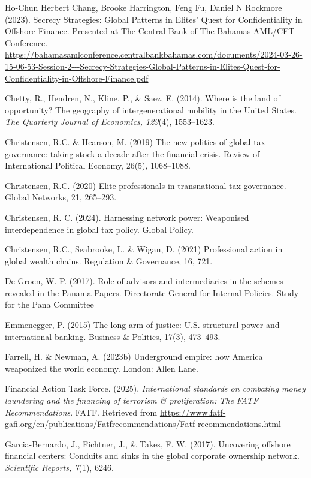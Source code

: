 \begin{thebibliography}{99}
Ho-Chun Herbert Chang, Brooke Harrington, Feng Fu, Daniel N Rockmore (2023). Secrecy Strategies: Global Patterns in Elites' Quest for Confidentiality in Offshore Finance. Presented at The Central Bank of The Bahamas AML/CFT Conference. \url{https://bahamasamlconference.centralbankbahamas.com/documents/2024-03-26-15-06-53-Session-2---Secrecy-Strategies-Global-Patterns-in-Elites-Quest-for-Confidentiality-in-Offshore-Finance.pdf}

Chetty, R., Hendren, N., Kline, P., \& Saez, E. (2014). Where is the land of opportunity? The geography of intergenerational mobility in the United States. \textit{The Quarterly Journal of Economics, 129}(4), 1553–1623.

Christensen, R.C. \& Hearson, M. (2019) The new politics of global tax governance: taking stock a decade after the financial crisis. Review of International Political Economy, 26(5), 1068–1088. 

Christensen, R.C. (2020) Elite professionals in transnational tax governance. Global Networks, 21, 265–293. 

Christensen, R. C. (2024). Harnessing network power: Weaponised interdependence in global tax policy. Global Policy.

Christensen, R.C., Seabrooke, L. \& Wigan, D. (2021) Professional action in global wealth chains. Regulation \& Governance, 16, 721. 

De Groen, W. P. (2017). Role of advisors and intermediaries in the schemes revealed in the Panama Papers. Directorate-General for Internal Policies. Study for the Pana Committee

Emmenegger, P. (2015) The long arm of justice: U.S. structural power and international banking. Business \& Politics, 17(3), 473–493. 

Farrell, H. \& Newman, A. (2023b) Underground empire: how America weaponized the world economy. London: Allen Lane.

Financial Action Task Force. (2025). \textit{International standards on combating money laundering and the financing of terrorism \& proliferation: The FATF Recommendations}. FATF. Retrieved from \url{https://www.fatf-gafi.org/en/publications/Fatfrecommendations/Fatf-recommendations.html}

Garcia-Bernardo, J., Fichtner, J., \& Takes, F. W. (2017). Uncovering offshore financial centers: Conduits and sinks in the global corporate ownership network. \textit{Scientific Reports, 7}(1), 6246. 


\end{thebibliography}
